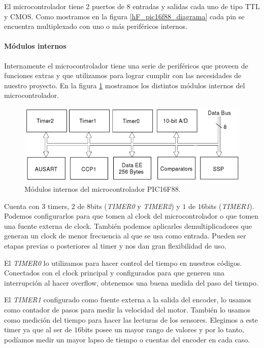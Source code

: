 El microcontrolador tiene 2 puertos de 8 entradas y salidas cada uno de tipo TTL y CMOS.
Como mostramos en la figura \ref{hF_pic16f88_diagrama} cada pin se encuentra multiplexado con uno o m\'as perif\'ericos internos.

\paragraph{M\'odulos internos}
\label{h_controlador_micro_modulos}

Internamente el microcontrolador tiene una serie de perif\'ericos que proveen de funciones extras y que utilizamos para lograr
cumplir con las necesidades de nuestro proyecto.
En la figura \ref{hF_pic16f88_modulos} mostramos los distintos m\'odulos internos del microcontrolador.

\begin{figure}[b]
	\centering
	\includegraphics[scale=0.35]{figuras/pic16f88_modulos.png}
	\caption{M\'odulos internos del microcontrolador PIC16F88.}
	\label{hF_pic16f88_modulos}
\end{figure}

Cuenta con $3$ timers, $2$ de $8$bits (\emph{TIMER0} y \emph{TIMER2}) y $1$ de $16$bits (\emph{TIMER1}).
Podemos configurarlos para que tomen al clock del microcontrolador o que tomen una fuente externa de clock.
Tambi\'en podemos aplicarles demultiplicadores que generan un clock de menor frecuencia al que se usa como entrada.
Pueden ser etapas previas o posteriores al timer y nos dan gran flexibilidad de uso.

El \emph{TIMER0} lo utilizamos para hacer control del tiempo en nuestros c\'odigos.
Conectados con el clock principal y configurados para que generen una interrupci\'on al hacer overflow,
obtenemos una buena medida del paso del tiempo.

El \emph{TIMER1} configurado como fuente externa a la salida del encoder, lo usamos como contador de pasos para medir la
velocidad del motor.
Tambi\'en lo usamos como medici\'on del tiempo para hacer las lecturas de los sensores.
Elegimos a este timer ya que al ser de $16$bits posee un mayor rango de valores y por lo tanto, pod\'iamos medir un mayor lapso
de tiempo o cuentas del encoder en cada caso.


